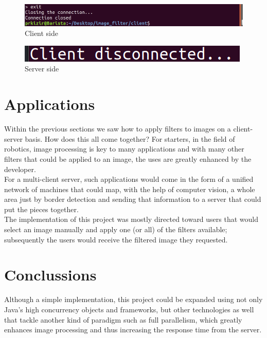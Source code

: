 \documentclass[a4paper,12pt]{article}
\begin{document}
	\begin{figure}[H]
		\centering
		\includegraphics[width=\textwidth]{exitclient.png}
		\caption{Client side}
	\end{figure}	
	
	\begin{figure}[H]
		\centering
		\includegraphics[width=\textwidth]{clientdisconnected.png}
		\caption{Server side}
	\end{figure}	
	
	
	\section{Applications}

	Within the previous sections we saw how to apply filters to images on a client-server basis. How does this all come together? For starters, in the field of robotics, image processing is key to many applications and with many other filters that could be applied to an image, the uses are greatly enhanced by the developer.\\
	
	For a multi-client server, such applications would come in the form of a unified network of machines that could map, with the help of computer vision, a whole area just by border detection and sending that information to a server that could put the pieces together.\\
	
	The implementation of this project was mostly directed toward users that would select an image manually and apply one (or all) of the filters available; subsequently the users would receive the filtered image they requested.\\

	\section{Conclussions}
	
	Although a simple implementation, this project could be expanded using not only Java's high concurrency objects and frameworks, but other technologies as well that tackle another kind of paradigm such as full parallelism, which greatly enhances image processing and thus increasing the response time from the server.\\
	
\end{document}
